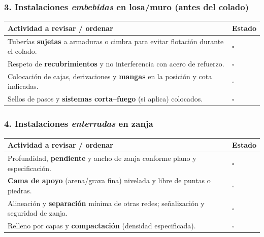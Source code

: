\documentclass[12pt]{article}
\newcommand{\cbox}{\(\square\)} %
\begin{document}
	\subsubsection*{3. Instalaciones \textit{embebidas} en losa/muro (antes del colado)}
	\begin{tabularx}{\linewidth}{>{\raggedright\arraybackslash}p{0.93\linewidth} >{\centering\arraybackslash}m{0.07\linewidth}}
		\toprule
		\textbf{Actividad a revisar / ordenar} & \textbf{Estado}\\
		\midrule
		Tuberías \textbf{sujetas} a armaduras o cimbra para evitar flotación durante el colado. & \cbox \\
		Respeto de \textbf{recubrimientos} y no interferencia con acero de refuerzo. & \cbox \\
		Colocación de cajas, derivaciones y \textbf{mangas} en la posición y cota indicadas. & \cbox \\
		Sellos de pasos y \textbf{sistemas corta–fuego} (si aplica) colocados. & \cbox \\
		\bottomrule
	\end{tabularx}
	
	\subsubsection*{4. Instalaciones \textit{enterradas} en zanja}
	\begin{tabularx}{\linewidth}{>{\raggedright\arraybackslash}p{0.93\linewidth} >{\centering\arraybackslash}m{0.07\linewidth}}
		\toprule
		\textbf{Actividad a revisar / ordenar} & \textbf{Estado}\\
		\midrule
		Profundidad, \textbf{pendiente} y ancho de zanja conforme plano y especificación. & \cbox \\
		\textbf{Cama de apoyo} (arena/grava fina) nivelada y libre de puntas o piedras. & \cbox \\
		Alineación y \textbf{separación} mínima de otras redes; señalización y seguridad de zanja. & \cbox \\
		Relleno por capas y \textbf{compactación} (densidad especificada). & \cbox \\
		\bottomrule
	\end{tabularx}
	
\end{document}
